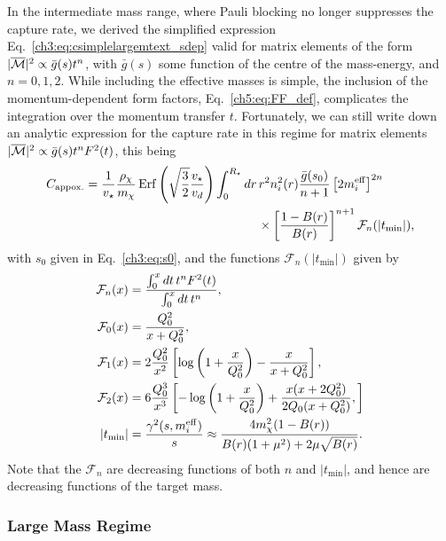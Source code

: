 In the intermediate mass range, where Pauli blocking no longer suppresses the capture rate, we derived the simplified expression Eq.~\ref{ch3:eq:csimplelargemtext_sdep} valid for matrix elements of the form $|\overline{\mathcal M}|^2 \propto \bar{g}(s) t^n$, with $\bar{g}(s)$ some function of the centre of the mass-energy, and $n = 0, 1, 2$. While including the effective masses is simple, the inclusion of the momentum-dependent form factors, Eq.~\ref{ch5:eq:FF_def}, complicates the integration over the momentum transfer $t$. Fortunately, we can still write down an analytic expression for the capture rate in this regime for matrix elements $|\overline{\mathcal M}|^2 \propto \bar{g}(s) t^n F^2(t)$, this being
\begin{equation}
   \begin{split}
      C_\mathrm{appox.} &= \frac{1}{\vstar} \frac{\rho_\chi}{\mchi}\erf\left(\sqrt{\frac{3}{2}}\frac{\vstar}{v_d}\right)\int_0^{\Rstar}dr\,r^2n_i^2(r) \frac{\bar{g}(s_0)}{n+1}\left[2 \mbeff\right]^{2n} \\
      & \hspace{14em}\times\left[\frac{1 - B(r)}{B(r)}\right]^{n+1} \mathcal{F}_n(|t_\mathrm{min}|),
   \end{split}
   \label{ch5:eq:capture_simple}
\end{equation}
with $s_0$ given in Eq.~\ref{ch3:eq:s0}, and the functions $\mathcal{F}_n(|t_\mathrm{min}|)$ given by
\begin{align}
   \mathcal{F}_n(x) & = \frac{\int_0^x dt\,t^n F^2(t)}{\int_0^x dt\,t^n},\\
   \mathcal{F}_0(x) & = \frac{Q_0^2}{x + Q_0^2},\\
   \mathcal{F}_1(x) & = 2\frac{Q_0^2}{x^2} \left[\log\left(1 + \frac{x}{Q_0^2}\right) - \frac{x}{x + Q_0^2 }\right],\\
   \mathcal{F}_2(x) & = 6 \frac{Q_0^3}{x^3}\left[ -\log\left(1 + \frac{x}{Q_0^2}\right) + \frac{x (x + 2Q_0^2)}{2 Q_0(x + Q_0^2)} ,\right]\\
   |t_\mathrm{min}| & = \frac{\gamma^2(s, m_i^{\rm eff})}{s} \approx\frac{4 m_\chi^2( 1 - B(r))}{B(r)(1 + \mu^2) + 2 \mu\sqrt{B(r)}}.
\end{align}
Note that the $\mathcal{F}_n$ are decreasing functions of both $n$ and $|t_\mathrm{min}|$, and hence are decreasing functions of the target mass.

\subsubsection{Large Mass Regime}


